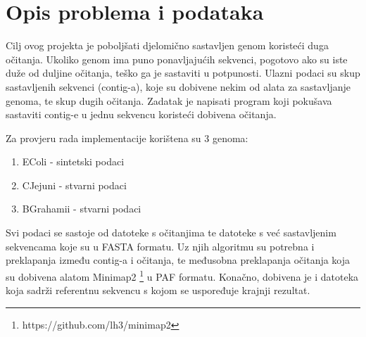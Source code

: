 \chapter{Opis problema i podataka}
Cilj ovog projekta je poboljšati djelomično sastavljen genom koristeći duga očitanja. Ukoliko genom ima puno ponavljajućih sekvenci, pogotovo ako su iste duže od duljine očitanja, teško ga je sastaviti u potpunosti. Ulazni podaci su skup sastavljenih sekvenci (contig-a), koje su dobivene nekim od alata za sastavljanje genoma, te skup dugih očitanja. Zadatak je napisati program koji pokušava sastaviti contig-e u jednu sekvencu koristeći dobivena očitanja.

Za provjeru rada implementacije korištena su 3 genoma:
\begin{enumerate}
\item EColi - sintetski podaci
\item CJejuni - stvarni podaci
\item BGrahamii - stvarni podaci
\end{enumerate}

Svi podaci se sastoje od datoteke s očitanjima te datoteke s već sastavljenim sekvencama koje su u FASTA formatu. Uz njih algoritmu su potrebna i preklapanja između contig-a i očitanja, te međusobna preklapanja očitanja koja su dobivena alatom Minimap2 \footnote{https://github.com/lh3/minimap2} u PAF formatu. Konačno, dobivena je i datoteka koja sadrži referentnu sekvencu s kojom se uspoređuje krajnji rezultat.